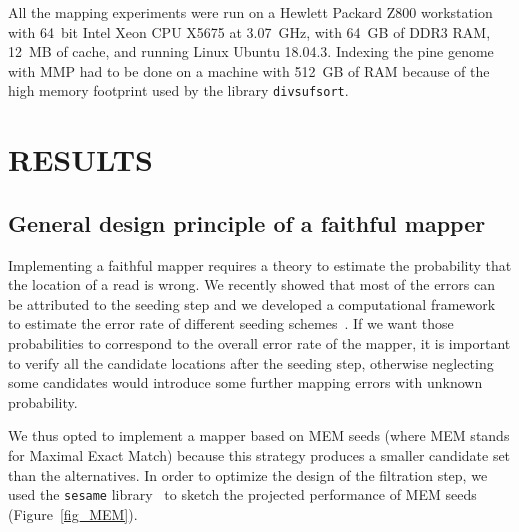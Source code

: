 \documentclass[a4,center,fleqn]{NAR}
\begin{document}
All the mapping experiments were run on a Hewlett Packard Z800 workstation
with 64~bit Intel Xeon CPU X5675 at 3.07~GHz, with 64~GB of DDR3 RAM,
12~MB of cache, and running Linux Ubuntu 18.04.3. Indexing the pine genome
with MMP had to be done on a machine with 512~GB of RAM because of the
high memory footprint used by the library \texttt{divsufsort}.


\section{RESULTS}

\subsection{General design principle of a faithful mapper}

Implementing a faithful mapper requires a theory to estimate the
probability that the location of a read is wrong. We recently showed that
most of the errors can be attributed to the seeding step and we developed
a computational framework to estimate the error rate of different seeding
schemes~\cite{Filion619155}. If we want those probabilities to correspond
to the overall error rate of the mapper, it is important to verify all the
candidate locations after the seeding step, otherwise neglecting some
candidates would introduce some further mapping errors with unknown
probability.

We thus opted to implement a mapper based on MEM seeds (where MEM stands
for Maximal Exact Match) because this strategy produces a smaller
candidate set than the alternatives. In order to optimize the design of
the filtration step, we used the \texttt{sesame}
library~\cite{Filion619155} to sketch the projected performance of MEM
seeds (Figure~\ref{fig_MEM}).
\end{document}
